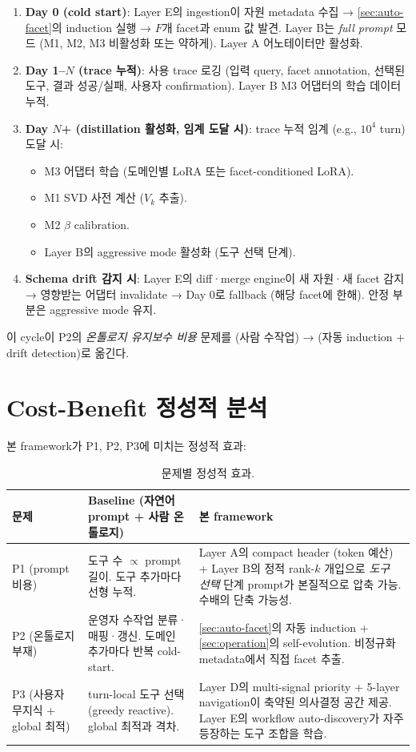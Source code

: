 \documentclass[11pt]{article}
\theoremstyle{definition}
\begin{document}
\begin{enumerate}[leftmargin=*]
\item \textbf{Day 0 (cold start)}: Layer E의 ingestion이 자원 metadata 수집 → \cref{sec:auto-facet}의 induction 실행 → $F$개 facet과 enum 값 발견. Layer B는 \emph{full prompt} 모드 (M1, M2, M3 비활성화 또는 약하게). Layer A 어노테이터만 활성화.
\item \textbf{Day 1--$N$ (trace 누적)}: 사용 trace 로깅 (입력 query, facet annotation, 선택된 도구, 결과 성공/실패, 사용자 confirmation). Layer B M3 어댑터의 학습 데이터 누적.
\item \textbf{Day $N$+ (distillation 활성화, 임계 도달 시)}: trace 누적 임계 (e.g., $10^4$ turn) 도달 시:
   \begin{itemize}[leftmargin=*]
   \item M3 어댑터 학습 (도메인별 LoRA 또는 facet-conditioned LoRA).
   \item M1 SVD 사전 계산 ($V_k$ 추출).
   \item M2 $\beta$ calibration.
   \item Layer B의 aggressive mode 활성화 (도구 선택 단계).
   \end{itemize}
\item \textbf{Schema drift 감지 시}: Layer E의 diff·merge engine이 새 자원·새 facet 감지 → 영향받는 어댑터 invalidate → Day 0로 fallback (해당 facet에 한해). 안정 부분은 aggressive mode 유지.
\end{enumerate}

이 cycle이 P2의 \emph{온톨로지 유지보수 비용} 문제를 (사람 수작업) → (자동 induction + drift detection)로 옮긴다.

\section{Cost-Benefit 정성적 분석}
\label{sec:cost-benefit}

본 framework가 P1, P2, P3에 미치는 정성적 효과:

\begin{table}[h]
\centering
\caption{문제별 정성적 효과.}
\label{tab:cost-benefit}
\small
\begin{tabular}{lp{}p{}}
\toprule
문제 & Baseline (자연어 prompt + 사람 온톨로지) & 본 framework \\
\midrule
P1 (prompt 비용) & 도구 수 $\propto$ prompt 길이. 도구 추가마다 선형 누적. & Layer A의 compact header (token 예산) + Layer B의 정적 rank-$k$ 개입으로 \emph{도구 선택} 단계 prompt가 본질적으로 압축 가능. 수배의 단축 가능성. \\
P2 (온톨로지 부재) & 운영자 수작업 분류·매핑·갱신. 도메인 추가마다 반복 cold-start. & \cref{sec:auto-facet}의 자동 induction + \cref{sec:operation}의 self-evolution. 비정규화 metadata에서 직접 facet 추출. \\
P3 (사용자 무지식 + global 최적) & turn-local 도구 선택 (greedy reactive). global 최적과 격차. & Layer D의 multi-signal priority + 5-layer navigation이 축약된 의사결정 공간 제공. Layer E의 workflow auto-discovery가 자주 등장하는 도구 조합을 학습. \\
\bottomrule
\end{tabular}
\end{table}
\end{document}
